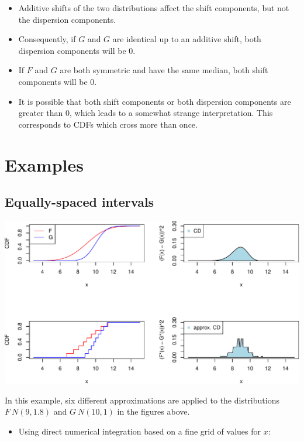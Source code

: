 \documentclass[
]{article}
\providecommand{\tightlist}{%
  \setlength{\itemsep}{0pt}\setlength{\parskip}{0pt}}
\begin{document}
\begin{itemize}
\item Additive shifts of the two distributions affect the shift components, but not the dispersion components.
\item Consequently, if $G$ and $G$ are identical up to an additive shift, both dispersion components will be 0.
\item If $F$ and $G$ are both symmetric and have the same median, both shift components will be 0.
\item It is possible that both shift components or both dispersion components are greater than 0, which leads to a somewhat strange interpretation. This corresponds to CDFs which cross more than once.
\end{itemize}

\hypertarget{examples}{%
\section{Examples}\label{examples}}

\hypertarget{equally-spaced-intervals}{%
\subsection{Equally-spaced intervals}\label{equally-spaced-intervals}}

\begin{center}\includegraphics{cd_approx_2_files/figure-latex/unnamed-chunk-11-1} \end{center}

In this example, six different approximations are applied to the
distributions \(F~N(9, 1.8)\) and \(G~N(10, 1)\) in the figures above.

\begin{itemize}
\tightlist
\item
  Using direct numerical integration based on a fine grid of values for
  \(x\):
\end{itemize}
\end{document}
